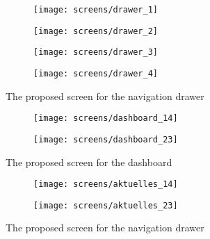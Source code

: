  




\begin{figure}[h]
	\centering
	\begin{subfigure}[b]{0.24\columnwidth}
		\centering
		\texttt{[image: screens/drawer\_1]}
		\label{fig:drawer:professional}
	\end{subfigure}
	\begin{subfigure}[b]{0.24\columnwidth}
		\centering
		\texttt{[image: screens/drawer\_2]}
		\label{fig:drawer:optimizer}
	\end{subfigure}
	\begin{subfigure}[b]{0.24\columnwidth}
		\centering
		\texttt{[image: screens/drawer\_3]}
		\label{fig:drawer:indifferent}
	\end{subfigure}
	\begin{subfigure}[b]{0.24\columnwidth}
		\centering
		\texttt{[image: screens/drawer\_4]}
		\label{fig:drawer:hedonist}
	\end{subfigure}
	\caption{The proposed screen for the navigation drawer}
	\label{fig:drawer} %
\end{figure}

\begin{figure}[h]
	\centering
	\begin{subfigure}[b]{0.24\columnwidth}
		\centering
		\texttt{[image: screens/dashboard\_14]}
		\label{fig:dasboard:professional}
	\end{subfigure}
	\begin{subfigure}[b]{0.24\columnwidth}
		\centering
		\texttt{[image: screens/dashboard\_23]}
		\label{fig:dashboard:optimizer}
	\end{subfigure}
	\caption{The proposed screen for the dashboard}
	\label{fig:dashboard} %
\end{figure}

\begin{figure}[h]
	\centering
	\begin{subfigure}[b]{0.24\columnwidth}
		\centering
		\texttt{[image: screens/aktuelles\_14]}
		\label{fig:aktuelles:professional}
	\end{subfigure}
	\begin{subfigure}[b]{0.24\columnwidth}
		\centering
		\texttt{[image: screens/aktuelles\_23]}
		\label{fig:aktuelles:optimizer}
	\end{subfigure}
	\caption{The proposed screen for the navigation drawer}
	\label{fig:aktuelles} %
\end{figure}

